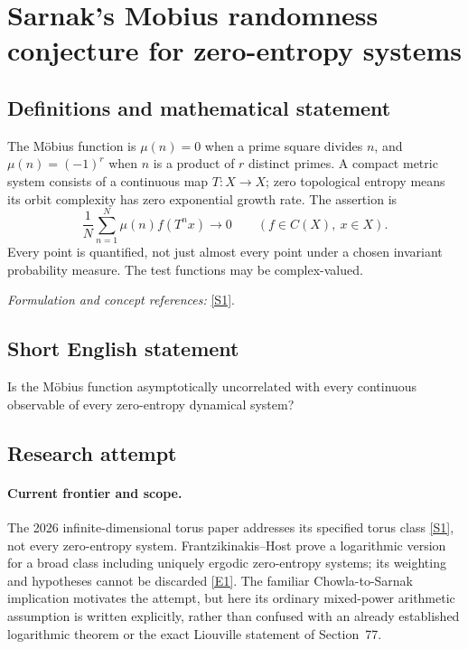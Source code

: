 \documentclass[11pt,a4paper]{article}
\numberwithin{equation}{section}
\newcommand{\sref}[2]{\hyperlink{source:#1:#2}{[S#2]}}
\newcommand{\eref}[2]{\hyperlink{extra:#1:#2}{[E#2]}}
\newif\ifshowcatalogue
\newcommand{\cataloguescope}[1]{\ifshowcatalogue
 \paragraph{Exact scope in the supplied catalogue.}
 \begin{quote}\small #1\end{quote}\fi}
\begin{document}
\setcounter{section}{83}
\section{\texorpdfstring{Sarnak's Mobius randomness conjecture for zero-entropy systems}{Sarnak's Mobius randomness conjecture for zero-entropy systems}}\label{84}
\subsection{Definitions and mathematical statement}
The Möbius function is $\mu(n)=0$ when a prime square divides $n$, and $\mu(n)=(-1)^r$ when $n$ is a product of $r$ distinct primes. A compact metric system consists of a continuous map $T:X\to X$; zero topological entropy means its orbit complexity has zero exponential growth rate. The assertion is
\[
 \frac1N\sum_{n=1}^{N}\mu(n)f(T^nx)\longrightarrow0
 \qquad(f\in C(X),\ x\in X).
\]
Every point is quantified, not just almost every point under a chosen invariant probability measure. The test functions may be complex-valued.
\par\smallskip\textit{Formulation and concept references:} \sref{84}{1}.
\cataloguescope{Prove that for every compact metric topological dynamical system (X,T) of zero topological entropy, every continuous f on X, and every x in X, the average N\textasciicircum{}(-1) sum\_\{n<=N\} mu(n) f(T\textasciicircum{}n x) tends to zero as N tends to infinity.}
\subsection{Short English statement}
Is the Möbius function asymptotically uncorrelated with every continuous observable of every zero-entropy dynamical system?
\subsection{Research attempt}

\paragraph{Current frontier and scope.}
The 2026 infinite-dimensional torus paper addresses its specified torus
class \sref{84}{1}, not every zero-entropy system. Frantzikinakis--Host
prove a logarithmic version for a broad class including uniquely ergodic
zero-entropy systems; its weighting and hypotheses cannot be discarded
\eref{84}{1}. The familiar Chowla-to-Sarnak implication motivates the
attempt, but here its ordinary mixed-power arithmetic assumption is
written explicitly, rather than confused with an already established
logarithmic theorem or the exact Liouville statement of Section~77.
\end{document}
